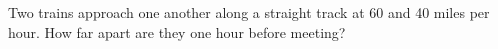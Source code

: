 Two trains approach one another along a straight track at 60 and 40 miles per hour. How far apart are they one hour before meeting?
